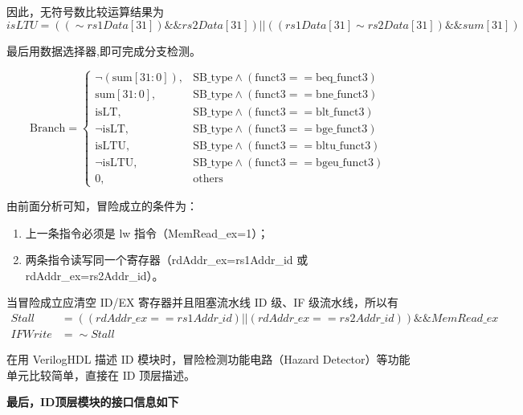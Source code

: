 \documentclass[12pt,hyperref,a4paper,UTF8]{ctexart}
\begin{document}
因此，无符号数比较运算结果为
\begin{equation}
isLTU = ((\sim rs1Data[31]) \&\& rs2Data[31]) || ((rs1Data[31] \sim rs2Data[31]) \&\& sum[31]) 
\end{equation}

最后用数据选择器,即可完成分支检测。

\[
\text{Branch} = 
\begin{cases} 
\neg (\text{sum}[31:0]), & \text{SB\_type} \land (\text{funct3} == \text{beq\_funct3}) \\
\text{sum}[31:0], & \text{SB\_type} \land (\text{funct3} == \text{bne\_funct3}) \\
\text{isLT}, & \text{SB\_type} \land (\text{funct3} == \text{blt\_funct3}) \\
\neg \text{isLT}, & \text{SB\_type} \land (\text{funct3} == \text{bge\_funct3}) \\
\text{isLTU}, & \text{SB\_type} \land (\text{funct3} == \text{bltu\_funct3}) \\
\neg \text{isLTU}, & \text{SB\_type} \land (\text{funct3} == \text{bgeu\_funct3}) \\
0, & \text{others}
\end{cases}
\]


由前面分析可知，冒险成立的条件为：
\begin{enumerate}
    \item 上一条指令必须是 lw 指令（MemRead\_ex=1）；
    \item 两条指令读写同一个寄存器（rdAddr\_ex=rs1Addr\_id 或 rdAddr\_ex=rs2Addr\_id）。
\end{enumerate}
当冒险成立应清空 ID/EX 寄存器并且阻塞流水线 ID 级、IF 级流水线，所以有
\begin{align*}
Stall &= ((rdAddr\_ex == rs1Addr\_id) || (rdAddr\_ex == rs2Addr\_id)) \&\& MemRead\_ex  \\
IFWrite &= \sim Stall 
\end{align*}

在用 VerilogHDL 描述 ID 模块时，冒险检测功能电路（Hazard Detector）等功能单元比较简单，直接在 ID 顶层描述。
  
\textbf{最后，ID顶层模块的接口信息如下}
\end{document}
